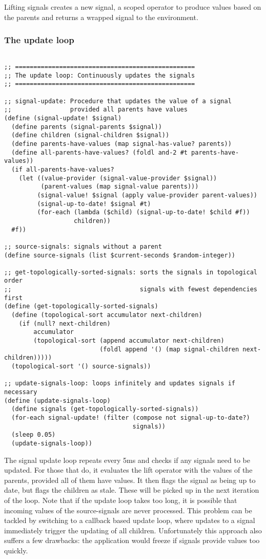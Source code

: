 Lifting signals creates a new signal, a scoped operator to produce values based on the parents and returns a wrapped signal to the environment. 

\newpage
\subsubsection{The update loop}
\begin{lstlisting}

;; =================================================
;; The update loop: Continuously updates the signals
;; =================================================

;; signal-update: Procedure that updates the value of a signal
;;                provided all parents have values
(define (signal-update! $signal)
  (define parents (signal-parents $signal))
  (define children (signal-children $signal))
  (define parents-have-values (map signal-has-value? parents))
  (define all-parents-have-values? (foldl and-2 #t parents-have-values))
  (if all-parents-have-values?
    (let ((value-provider (signal-value-provider $signal))
          (parent-values (map signal-value parents)))
         (signal-value! $signal (apply value-provider parent-values))
         (signal-up-to-date! $signal #t)
         (for-each (lambda ($child) (signal-up-to-date! $child #f))
                   children))
  #f))
  
;; source-signals: signals without a parent
(define source-signals (list $current-seconds $random-integer))
  
;; get-topologically-sorted-signals: sorts the signals in topological order
;;                                   signals with fewest dependencies first
(define (get-topologically-sorted-signals)
  (define (topological-sort accumulator next-children)
    (if (null? next-children)
        accumulator
        (topological-sort (append accumulator next-children) 
                          (foldl append '() (map signal-children next-children)))))
  (topological-sort '() source-signals))
  
;; update-signals-loop: loops infinitely and updates signals if necessary
(define (update-signals-loop)
  (define signals (get-topologically-sorted-signals))
  (for-each signal-update! (filter (compose not signal-up-to-date?) 
                                   signals))
  (sleep 0.05)
  (update-signals-loop))
\end{lstlisting}

The signal update loop repeats every 5ms and checks if any signals need to be updated. 
For those that do, it evaluates the lift operator with the values of the parents, provided all of them have values. It then flags the signal as being up to date, but flags the children as stale. These will be picked up in the next iteration of the loop. Note that if the update loop takes too long, it is possible that incoming values of the source-signals are never processed. This problem can be tackled by switching to a callback based update loop, where updates to a signal immediately trigger the updating of all children. Unfortunately this approach also suffers a few drawbacks: the application would freeze if signals provide values too quickly.

